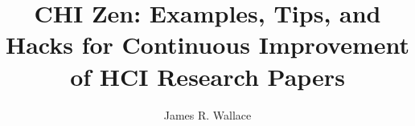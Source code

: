 \documentclass[manuscript,screen]{acmart}
\begin{document}
\title[Examples, Tips, and Hacks for Continuous Improvement of HCI Research Papers]{CHI Zen: Examples, Tips, and Hacks for Continuous Improvement of HCI Research Papers}

\author{James R. Wallace}












\maketitle
\end{document}
